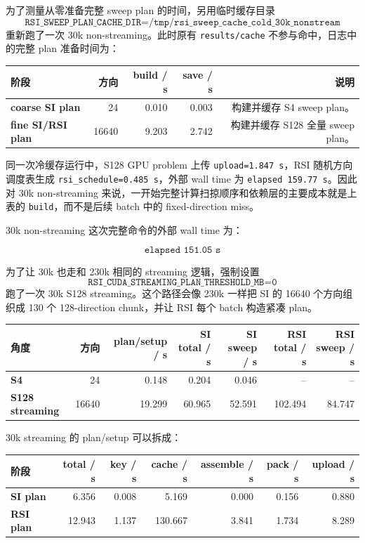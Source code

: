 \documentclass[10pt]{article}
\newcommand{\subsect}[1]{\vspace{2mm}{\sffamily\large\bfseries #1}\par}
\newcommand{\code}[1]{\texttt{#1}}
\begin{document}
为了测量从零准备完整 sweep plan 的时间，另用临时缓存目录
\[
\code{RSI\_SWEEP\_PLAN\_CACHE\_DIR=/tmp/rsi\_sweep\_cache\_cold\_30k\_nonstream}
\]
重新跑了一次 30k non-streaming。此时原有 \code{results/cache} 不参与命中，日志中的完整 plan 准备时间为：

\begin{tabularx}{\linewidth}{>{\bfseries}l r r r r}
\toprule
阶段 & 方向 & build / s & save / s & 说明\\
\midrule
\rowcolor{softrow}
coarse SI plan & 24 & 0.010 & 0.003 & 构建并缓存 S4 sweep plan。\\
fine SI/RSI plan & 16640 & 9.203 & 2.742 & 构建并缓存 S128 全量 sweep plan。\\
\bottomrule
\end{tabularx}

同一次冷缓存运行中，S128 GPU problem 上传 \code{upload=1.847 s}，RSI 随机方向调度表生成 \code{rsi\_schedule=0.485 s}，外部 wall time 为 \code{elapsed 159.77 s}。因此对 30k non-streaming 来说，一开始完整计算扫掠顺序和依赖层的主要成本就是上表的 \code{build}，而不是后续 batch 中的 fixed-direction miss。

30k non-streaming 这次完整命令的外部 wall time 为：

\[
\code{elapsed\ 151.05\ s}
\]

\subsect{8.2 30k streaming 计时}

为了让 30k 也走和 230k 相同的 streaming 逻辑，强制设置
\[
\code{RSI\_CUDA\_STREAMING\_PLAN\_THRESHOLD\_MB=0}
\]
跑了一次 30k S128 streaming。这个路径会像 230k 一样把 SI 的 16640 个方向组织成 130 个 128-direction chunk，并让 RSI 每个 batch 构造紧凑 plan。

\begin{tabularx}{\linewidth}{>{\bfseries}l r r r r r r}
\toprule
角度 & 方向 & plan/setup / s & SI total / s & SI sweep / s & RSI total / s & RSI sweep / s\\
\midrule
\rowcolor{softrow}
S4 & 24 & 0.148 & 0.204 & 0.046 & -- & --\\
S128 streaming & 16640 & 19.299 & 60.965 & 52.591 & 102.494 & 84.747\\
\bottomrule
\end{tabularx}

30k streaming 的 plan/setup 可以拆成：

\begin{tabularx}{\linewidth}{>{\bfseries}l r r r r r r}
\toprule
阶段 & total / s & key / s & cache / s & assemble / s & pack / s & upload / s\\
\midrule
\rowcolor{softrow}
SI plan & 6.356 & 0.008 & 5.169 & 0.000 & 0.156 & 0.880\\
RSI plan & 12.943 & 1.137 & 130.667 & 3.841 & 1.734 & 8.289\\
\bottomrule
\end{tabularx}
\end{document}
